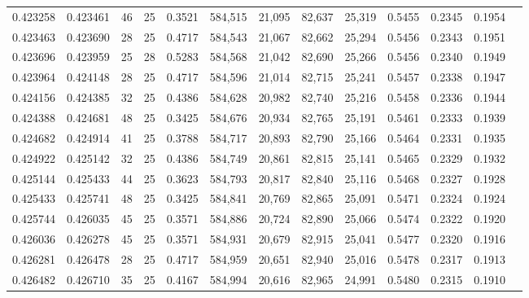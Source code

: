 \begin{tabular}{rrrrrrrrrrrrr}
0.423258 & 0.423461 &    46 &  25 &                                     0.3521 & 584,515 &  21,095 &  82,637 &  25,319 & 0.5455 & 0.2345 & 0.1954 \\
0.423463 & 0.423690 &    28 &  25 &                                     0.4717 & 584,543 &  21,067 &  82,662 &  25,294 & 0.5456 & 0.2343 & 0.1951 \\
0.423696 & 0.423959 &    25 &  28 &                                     0.5283 & 584,568 &  21,042 &  82,690 &  25,266 & 0.5456 & 0.2340 & 0.1949 \\
0.423964 & 0.424148 &    28 &  25 &                                     0.4717 & 584,596 &  21,014 &  82,715 &  25,241 & 0.5457 & 0.2338 & 0.1947 \\
0.424156 & 0.424385 &    32 &  25 &                                     0.4386 & 584,628 &  20,982 &  82,740 &  25,216 & 0.5458 & 0.2336 & 0.1944 \\
0.424388 & 0.424681 &    48 &  25 &                                     0.3425 & 584,676 &  20,934 &  82,765 &  25,191 & 0.5461 & 0.2333 & 0.1939 \\
0.424682 & 0.424914 &    41 &  25 &                                     0.3788 & 584,717 &  20,893 &  82,790 &  25,166 & 0.5464 & 0.2331 & 0.1935 \\
0.424922 & 0.425142 &    32 &  25 &                                     0.4386 & 584,749 &  20,861 &  82,815 &  25,141 & 0.5465 & 0.2329 & 0.1932 \\
0.425144 & 0.425433 &    44 &  25 &                                     0.3623 & 584,793 &  20,817 &  82,840 &  25,116 & 0.5468 & 0.2327 & 0.1928 \\
0.425433 & 0.425741 &    48 &  25 &                                     0.3425 & 584,841 &  20,769 &  82,865 &  25,091 & 0.5471 & 0.2324 & 0.1924 \\
0.425744 & 0.426035 &    45 &  25 &                                     0.3571 & 584,886 &  20,724 &  82,890 &  25,066 & 0.5474 & 0.2322 & 0.1920 \\
0.426036 & 0.426278 &    45 &  25 &                                     0.3571 & 584,931 &  20,679 &  82,915 &  25,041 & 0.5477 & 0.2320 & 0.1916 \\
0.426281 & 0.426478 &    28 &  25 &                                     0.4717 & 584,959 &  20,651 &  82,940 &  25,016 & 0.5478 & 0.2317 & 0.1913 \\
0.426482 & 0.426710 &    35 &  25 &                                     0.4167 & 584,994 &  20,616 &  82,965 &  24,991 & 0.5480 & 0.2315 & 0.1910 \\

\end{tabular}
